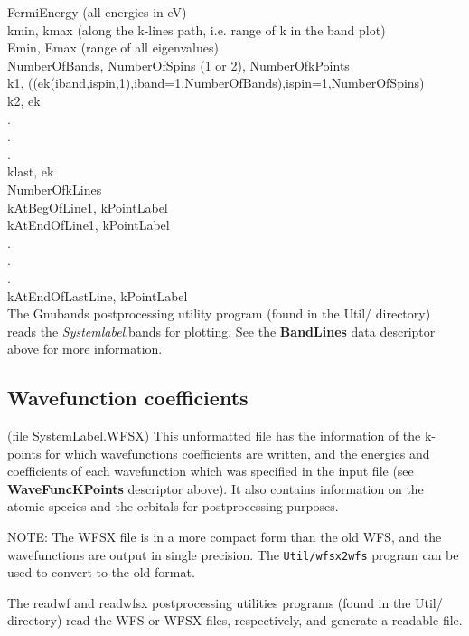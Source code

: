 \documentclass[11pt]{article}
\begin{document}
\noindent
FermiEnergy (all energies in eV) \\
kmin, kmax (along the k-lines path, i.e. range of k in the band plot) \\
Emin, Emax (range of all eigenvalues) \\
NumberOfBands, NumberOfSpins (1 or 2), NumberOfkPoints \\
k1, ((ek(iband,ispin,1),iband=1,NumberOfBands),ispin=1,NumberOfSpins) \\
k2, ek \\
 . \\
 . \\
 . \\
klast, ek \\
NumberOfkLines \\
kAtBegOfLine1, kPointLabel \\
kAtEndOfLine1, kPointLabel \\
  . \\
  . \\
  . \\
kAtEndOfLastLine, kPointLabel \\

\noindent
The {\sc Gnubands} postprocessing utility
program (found in the Util/ directory) reads the {\it Systemlabel}.bands
for plotting.
See the {\bf BandLines} data descriptor above for more information.

\subsection{Wavefunction coefficients}\label{subsec:wf}
(file SystemLabel.WFSX) This unformatted file has the
information of the k-points for which wavefunctions coefficients
are written, and the energies and coefficients of each
wavefunction which was specified in the input file
(see {\bf WaveFuncKPoints}
descriptor above).
It also contains information on the atomic species and
the orbitals for postprocessing purposes.

NOTE: The WFSX file is in a more compact form than the old WFS, and the
wavefunctions are output in single precision. The {\tt Util/wfsx2wfs}
program can be used to convert to the old format.

\noindent
The readwf and readwfsx postprocessing
utilities programs (found in the Util/ directory) read the WFS or WFSX
files, respectively, and generate a readable file.
\end{document}

